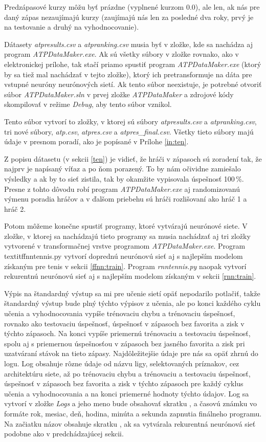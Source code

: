 Predzápasové kurzy môžu byť prázdne (vyplnené kurzom 0.0), ale len, ak nás pre daný zápas nezaujímajú kurzy (zaujímajú nás len za posledné dva roky, prvý je na testovanie a druhý na vyhodnocovanie).

Dátasety \textit{atpresults.csv} a \textit{atpranking.csv} musia byť v zložke, kde sa nachádza aj program \textit{ATPDataMaker.exe}.
Ak sú všetky súbory v zložke rovnako, ako v elektronickej prílohe, tak stačí priamo spustiť program \textit{ATPDataMaker.exe} (ktorý by sa tiež mal nachádzať v tejto zložke), ktorý ich pretransformuje na dáta pre vstupné neuróny neurónových sietí. 
Ak tento súbor neexistuje, je potrebné otvoriť súbor \textit{ATPDataMaker.sln} v prvej zložke \textit{ATPDataMaker} a zdrojové kódy skompilovať v režime \textit{Debug}, aby tento súbor vznikol.

Tento súbor vytvorí to zložky, v ktorej sú súbory \textit{atpresults.csv} a 
\textit{atpranking.csv}, tri nové súbory, 
\textit{atp.csv}, 
\textit{atpres.csv} a 
\textit{atpres\_final.csv}. 
Všetky tieto súbory majú údaje v presnom poradí, ako je popísané v Prílohe \ref{in:ten}.

Z popisu dátasetu (v sekcii \ref{ten}) je vidieť, že hráči v zápasoch sú zoradení tak, že najprv je napísaný víťaz a po ňom porazený. To by nám očividne zamiešalo výsledky a ak by to sieť zistila, tak by okamžite vypisovala úspešnosť 100\,\%.
Presne z tohto dôvodu robí program \textit{ATPDataMaker.exe} aj randomizovanú výmenu poradia hráčov a v ďalšom priebehu sú hráči rozlišovaní ako hráč 1 a hráč 2.

Potom môžeme konečne spustiť programy, ktoré vytvárajú neurónové siete.
V zložke, v ktorej sa nachádzajú tieto programy sa musia nachádzať aj tri zložky vytvorené v transformačnej vrstve programom \textit{ATPDataMaker.exe}.
Program textit{ffnntennis.py} vytvorí doprednú neurónovú sieť aj s najlepším modelom získaným pre tenis v sekcii \ref{ffnn:train}.
Program \textit{rnntennis.py} naopak vytvorí rekurentnú neurónovú sieť aj s najlepším modelom získaným v sekcii \ref{rnn:train}.

Výpis na štandardný výstup sa mi pre učenie sietí opäť nepodarilo potlačiť, takže štandardný výstup bude plný týchto výpisov z učenia, ale po konci každého cyklu učenia a vyhodnocovania vypíše trénovaciu chybu a trénovaciu úspešnosť, rovnako ako testovaciu úspešnosť, úspešnosť v zápasoch bez favorita a zisk v týchto zápasoch.
Na konci vypíše priemernú trénovaciu a testovaciu úspešnosť, spolu aj s priemernou úspešnosťou v zápasoch bez jasného favorita a zisk pri uzatváraní stávok na tieto zápasy. 
Najdôležitejšie údaje pre nás sa opäť zhrnú do logu. 
Log obsahuje rôzne údaje od názvu ligy, selektovaných príznakov, cez architektúru siete, až po trénovaciu chybu a trénovaciu a testovaciu úspešnosť, úspešnosť v zápasoch bez favorita a zisk v týchto zápasoch pre každý cyklus učenia a vyhodnocovania a na konci priemerné hodnoty týchto údajov.
Log sa vytvorí v zložke \textit{Logs} a jeho meno bude obsahovať skratku ,  a časovú známku vo formáte rok, mesiac, deň, hodina, minúta a sekunda zapnutia finálneho programu. Na začiatku názov obsahuje skratku , ak sa vytvárala rekurentná neurónová sieť podobne ako v predchádzajúcej sekcii.